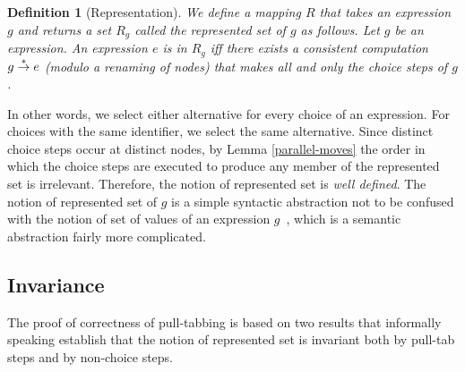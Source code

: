 \documentclass{mytlp}
\newcommand{\inparen}[1]{\mbox{\rm (}#1\mbox{\rm )}}
\newcommand{\modulo}{\inparen{modulo a renaming of nodes}}
\newcommand{\COMMENT}[1]{}
\newcommand{\todo}[1]{{\color{red}\sc [{#1}]}}
\newtheorem{definition}{Definition}
\newcommand{\tostar}{\buildrel * \over \to}
\newcommand{\rep}{R}
\begin{document}
\begin{definition}[Representation]
\label{representation}
We define a mapping $\rep$ that takes an expression $g$
and returns a set $\rep_g$ called the
\emph{represented set of $g$} as follows.
Let $g$ be an expression.
An expression $e$ is in $\rep_g$ iff
there exists a consistent computation $g \tostar e$
\modulo{}
that makes all and only the choice steps of $g$.
\end{definition}
In other words, we select either alternative for every
choice of an expression.  For choices with the same identifier,
we select the same alternative.
Since distinct choice steps occur at distinct nodes, by Lemma
\ref{parallel-moves} the order in which the choice steps are
executed to produce any member of the represented set 
is irrelevant.
Therefore, the notion of represented set is \emph{well defined}.
The notion of represented set of $g$ is a simple syntactic
abstraction not to be confused with the notion of set of values of
an expression $g$~\cite{AntoyHanus09PPDP}, which is a semantic
abstraction fairly more complicated.

\COMMENT{
\todo{NOTES:
If a choice has been pulled up, its two alternatives have
a non-empty fingerprint.
\\
If a choice is pulled above a node that has a non-empty
fingerprint, incompatibility can be detected locally.
}
}

\subsection{Invariance}

The proof of correctness of pull-tabbing
is based on two results that informally speaking 
establish that the notion of represented set
is invariant both by pull-tab steps and by non-choice steps.

\COMMENT{
\todo{Define $g$ and $g'$ are \emph{para-equal} iff
\emph{(1)}~ for any expression $e \in \rep_g$,
there exists an expression $e' \in \rep_{g'}$
such that $e = e'$ \modulo{}, and
\emph{(2)}~ for any expression $e' \in \rep_{g'}$, 
there exists an expression $e \in \rep_g$ 
such that $e = e'$ \modulo{}.
}
}
\end{document}
